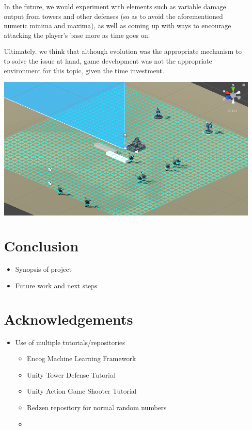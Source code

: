 \documentclass[letterpaper]{article}
\begin{document}
In the future, we would experiment with elements such as variable damage output from towers and other defenses (so as to avoid the aforementioned numeric minima and maxima), as well as coming up with ways to encourage attacking the player's base more as time goes on.

Ultimately, we think that although evolution was the appropriate mechanism to to solve the issue at hand, game development was not the appropriate environment for this topic, given the time investment.

\includegraphics[width=\columnwidth]{InGame2}

\section{Conclusion}
\begin{itemize}
    \item Synopsis of project
    \item Future work and next steps
\end{itemize}

\section{Acknowledgements}
\begin{itemize}
    \item Use of multiple tutorials/repositories
    \begin{itemize}
        \item Encog Machine Learning Framework
        \item Unity Tower Defense Tutorial
        \item Unity Action Game Shooter Tutorial
        \item Redzen repository for normal random numbers
        \item
    \end{itemize}
\end{itemize}

\footnotesize

\end{document}
